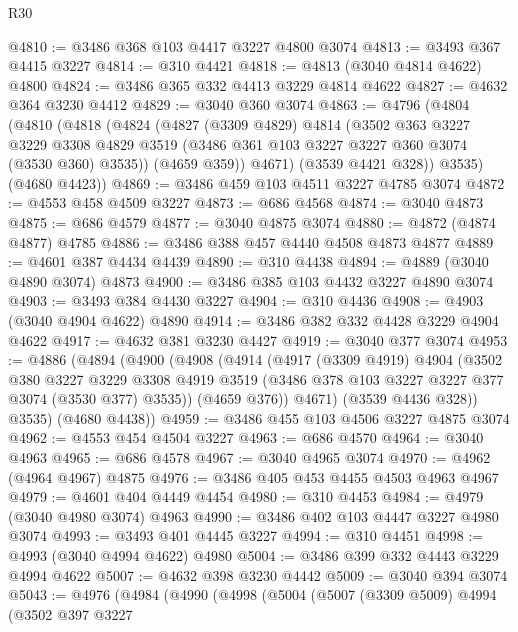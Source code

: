 \begin{lexlean}{R30}
\begin{coremodule}
@4810 := @3486 @368 @103 @4417 @3227 @4800 @3074
@4813 := @3493 @367 @4415 @3227
@4814 := @310 @4421
@4818 := @4813 (@3040 @4814 @4622) @4800
@4824 := @3486 @365 @332 @4413 @3229 @4814 @4622
@4827 := @4632 @364 @3230 @4412
@4829 := @3040 @360 @3074
@4863 := @4796
    (@4804
      (@4810
        (@4818
          (@4824
            (@4827
              (@3309 @4829)
              @4814
              (@3502
                @363
                @3227
                @3229
                @3308
                @4829
                @3519
                (@3486 @361 @103 @3227 @3227 @360 @3074 (@3530 @360) @3535))
              (@4659 @359))
            @4671)
          (@3539 @4421 @328))
        @3535)
      (@4680 @4423))
@4869 := @3486 @459 @103 @4511 @3227 @4785 @3074
@4872 := @4553 @458 @4509 @3227
@4873 := @686 @4568
@4874 := @3040 @4873
@4875 := @686 @4579
@4877 := @3040 @4875 @3074
@4880 := @4872 (@4874 @4877) @4785
@4886 := @3486 @388 @457 @4440 @4508 @4873 @4877
@4889 := @4601 @387 @4434 @4439
@4890 := @310 @4438
@4894 := @4889 (@3040 @4890 @3074) @4873
@4900 := @3486 @385 @103 @4432 @3227 @4890 @3074
@4903 := @3493 @384 @4430 @3227
@4904 := @310 @4436
@4908 := @4903 (@3040 @4904 @4622) @4890
@4914 := @3486 @382 @332 @4428 @3229 @4904 @4622
@4917 := @4632 @381 @3230 @4427
@4919 := @3040 @377 @3074
@4953 := @4886
    (@4894
      (@4900
        (@4908
          (@4914
            (@4917
              (@3309 @4919)
              @4904
              (@3502
                @380
                @3227
                @3229
                @3308
                @4919
                @3519
                (@3486 @378 @103 @3227 @3227 @377 @3074 (@3530 @377) @3535))
              (@4659 @376))
            @4671)
          (@3539 @4436 @328))
        @3535)
      (@4680 @4438))
@4959 := @3486 @455 @103 @4506 @3227 @4875 @3074
@4962 := @4553 @454 @4504 @3227
@4963 := @686 @4570
@4964 := @3040 @4963
@4965 := @686 @4578
@4967 := @3040 @4965 @3074
@4970 := @4962 (@4964 @4967) @4875
@4976 := @3486 @405 @453 @4455 @4503 @4963 @4967
@4979 := @4601 @404 @4449 @4454
@4980 := @310 @4453
@4984 := @4979 (@3040 @4980 @3074) @4963
@4990 := @3486 @402 @103 @4447 @3227 @4980 @3074
@4993 := @3493 @401 @4445 @3227
@4994 := @310 @4451
@4998 := @4993 (@3040 @4994 @4622) @4980
@5004 := @3486 @399 @332 @4443 @3229 @4994 @4622
@5007 := @4632 @398 @3230 @4442
@5009 := @3040 @394 @3074
@5043 := @4976
    (@4984
      (@4990
        (@4998
          (@5004
            (@5007
              (@3309 @5009)
              @4994
              (@3502
                @397
                @3227

\end{coremodule}
\end{lexlean}
